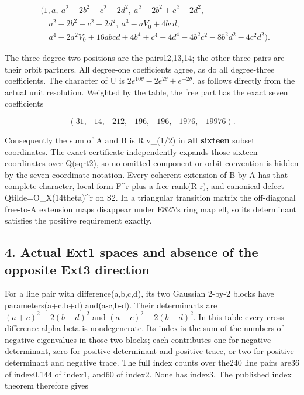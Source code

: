 \[
 \begin{split}
 &(1,a,\ a^2+2b^2-c^2-2d^2,\ a^2-2b^2+c^2-2d^2,\\
 &\quad a^2-2b^2-c^2+2d^2,\ a^3-aV_0+4bcd,\\
 &\quad a^4-2a^2V_0+16abcd+4b^4+c^4+4d^4
                      -4b^2c^2-8b^2d^2-4c^2d^2).
 \end{split}
 \tag{E826.8}
\]

The three degree-two positions are the pairs12,13,14; the other three pairs
are their orbit partners. All degree-one coefficients agree, as do all
degree-three coefficients. The character of U is
\(2e^{10\theta}-2e^{2\theta}+e^{-2\theta}\), as follows directly from the
actual unit resolution. Weighted by the table, the free part has the exact
seven coefficients

\[
 (31,-14,-212,-196,-196,-1976,-19976).
 \tag{E826.9}
\]

Consequently the sum of A and B is R v\_(1/2) in \textbf{all sixteen} subset
coordinates. The exact certificate independently expands those sixteen
coordinates over Q(sqrt2), so no omitted component or orbit convention is
hidden by the seven-coordinate notation. Every coherent extension of B by A
has that complete character, local form F\^{}r plus a free rank(R-r), and
canonical defect Qtilde=O\_X(14theta)\^{}r on S2. In a triangular transition
matrix the off-diagonal free-to-A extension maps disappear under E825's ring
map ell, so its determinant satisfies the positive requirement exactly.

\subsection{4. Actual Ext1 spaces and absence of the opposite Ext3
direction}\label{SF-E826:actual-ext1-spaces-and-absence-of-the-opposite-ext3-direction}

For a line pair with difference(a,b,c,d), its two Gaussian 2-by-2 blocks
have parameters(a+c,b+d) and(a-c,b-d). Their determinants are
\((a+c)^2-2(b+d)^2\) and \((a-c)^2-2(b-d)^2\). In this table every cross
difference alpha-beta is nondegenerate. Its index is the sum of the numbers
of negative eigenvalues in those two blocks; each contributes one for
negative determinant, zero for positive determinant and positive trace, or
two for positive determinant and negative trace. The full index counts over
the240 line pairs are36 of index0,144 of index1, and60 of index2. None has
index3. The published index theorem therefore gives


